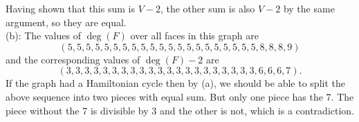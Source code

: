 \documentclass{amsart}
\begin{document}
	Having shown that this sum is $V-2$, the other sum is also $V-2$ by the same argument, so they are equal.\\
	
	(b): The values of $\deg(F)$ over all faces in this graph are 
	$$
	(5,5,5,5,5,5,5,5,5,5,5,5,5,5,5,5,5,5,5,5,5,8,8,8,9)
	$$
	and the corresponding values of $\deg(F) - 2$ are 
	$$
	(3,3,3,3,3,3,3,3,3,3,3,3,3,3,3,3,3,3,3,3,3,6,6,6,7).
	$$
	If the graph had a Hamiltonian cycle then by (a), we should be able to split the above sequence into two pieces with equal sum. But only one piece has the 7. The piece without the 7 is divisible by 3 and the other is not, which is a contradiction.
	
\end{document}
